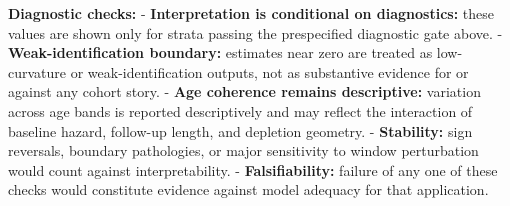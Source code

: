 \documentclass[
]{article}
\begin{document}
\textbf{Diagnostic checks:} - \textbf{Interpretation is conditional on
diagnostics:} these values are shown only for strata passing the
prespecified diagnostic gate above. - \textbf{Weak-identification
boundary:} estimates near zero are treated as low-curvature or
weak-identification outputs, not as substantive evidence for or against
any cohort story. - \textbf{Age coherence remains descriptive:}
variation across age bands is reported descriptively and may reflect the
interaction of baseline hazard, follow-up length, and depletion
geometry. - \textbf{Stability:} sign reversals, boundary pathologies, or
major sensitivity to window perturbation would count against
interpretability. - \textbf{Falsifiability:} failure of any one of these
checks would constitute evidence against model adequacy for that
application.

\newpage
\end{document}
